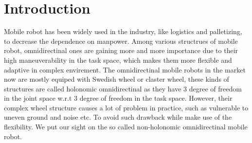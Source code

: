 \chapter{Introduction}
\label{cha:introduction}

Mobile robot has been widely used in the industry, like logistics and palletizing, to decrease the dependence on manpower. Among various structrues of mobile robot, omnidirectinal ones are gaining more and more 
importance due to their high maneuverability in the task space, which makes them more flexible and adaptive in complex envirement. The omnidirectinal mobile robots in the market now are mostly equiped with 
Swedish wheel or claster wheel, these kinds of structures are called holonomic omnidirectinal as they have 3 degree of freedom in the joint space w.r.t 3 degree of freedom in the task space. However, their complex 
wheel structure causes a lot of problem in practice, such as vulnerable to uneven ground and noise etc. To avoid such drawback while make use of the flexibility. We put our sight on the so called non-holonomic 
omnidirectinal mobile robot. 

